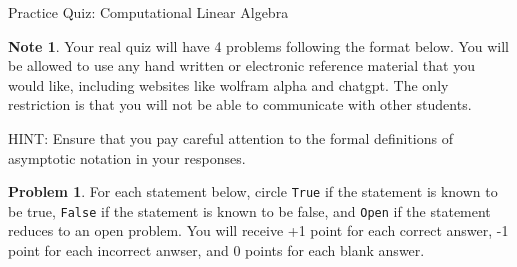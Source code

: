 \documentclass[10pt]{exam}
\theoremstyle{definition}
\newtheorem{problem}{Problem}
\newtheorem{note}{Note}
\begin{document}
\begin{center}
{
\Huge
    Practice Quiz: Computational Linear Algebra
}
\end{center}

\begin{note}
Your real quiz will have 4 problems following the format below.
You will be allowed to use any hand written or electronic reference material that you would like,
including websites like wolfram alpha and chatgpt.
The only restriction is that you will not be able to communicate with other students.

HINT:
Ensure that you pay careful attention to the formal definitions of asymptotic notation in your responses.
\end{note}

\begin{problem}
    For each statement below,
    circle \texttt{True} if the statement is known to be true,
    \texttt{False} if the statement is known to be false,
    and \texttt{Open} if the statement reduces to an open problem.
    You will receive +1 point for each correct answer,
    -1 point for each incorrect anwser,
    and 0 points for each blank answer.



\end{problem}
\end{document}
